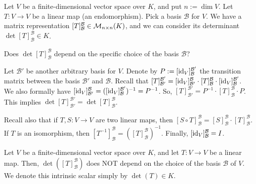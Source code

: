 Let $V$ be a finite-di\-men\-sional vector space over $K$, and put $n := \dim V$. Let $T : V \to V$ be a linear map (an endomorphism). Pick a basis $\mathcal{B}$ for $V$. We have a matrix representation $[T]_{\mathcal{B}}^{\mathcal{B}} \in \mathcal{M}_{n \times n}(K)$, and we can consider its determinant $\det [T]_{\mathcal{B}}^{\mathcal{B}} \in K$.

\begin{question} Does $\det [T]_{\mathcal{B}}^{\mathcal{B}}$ depend on the specific choice of the basis $\mathcal{B}$?
\end{question}

\begin{answer} Let $\mathcal{B}'$ be another arbitrary basis for $V$. Denote by $P := [\operatorname{id}_V]_{\mathcal{B}}^{\mathcal{B}'}$ the transition matrix between the basis $\mathcal{B}'$ and $\mathcal{B}$. Recall that $[T]_{\mathcal{B}'}^{\mathcal{B}'} = [\operatorname{id}_V]_{\mathcal{B}'}^{\mathcal{B}} \cdot [T]_{\mathcal{B}}^{\mathcal{B}} \cdot [\operatorname{id}_V]_{\mathcal{B}}^{\mathcal{B}'}$.
  We also formally have $[\operatorname{id}_V]_{\mathcal{B}'}^{\mathcal{B}} = ([\operatorname{id}_V]_{\mathcal{B}}^{\mathcal{B}'})^{-1} = P^{-1}$.
  So, $[T]_{\mathcal{B}'}^{\mathcal{B}'} = P^{-1} \cdot [T]_{\mathcal{B}}^{\mathcal{B}} \cdot P$. This implies $\det [T]_{\mathcal{B}'}^{\mathcal{B}'} = \det [T]_{\mathcal{B}}^{\mathcal{B}}$.

  Recall also that if $T, S : V \to V$ are two linear maps, then $[S \circ T]_{\mathcal{B}}^{\mathcal{B}} = [S]_{\mathcal{B}}^{\mathcal{B}} \cdot [T]_{\mathcal{B}}^{\mathcal{B}}$. If $T$ is an isomorphism, then $[T^{-1}]_{\mathcal{B}}^{\mathcal{B}} = ([T]_{\mathcal{B}}^{\mathcal{B}})^{-1}$. Finally, $[\operatorname{id}_V]_{\mathcal{B}}^{\mathcal{B}} = I$.
\end{answer}

\begin{corollary}
  \label{cor:det_endomorphism}
  Let $V$ be a finite-di\-men\-sional vector space over $K$, and let $T : V \to V$ be a linear map. Then, $\det([T]_{\mathcal{B}}^{\mathcal{B}})$ does NOT depend on the choice of the basis $\mathcal{B}$ of $V$. We denote this intrinsic scalar simply by $\det(T) \in K$.
\end{corollary}

